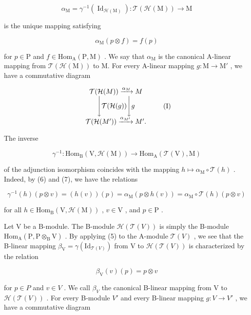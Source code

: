 \[
\alpha_ {\mathrm{M}} = \gamma^ {- 1} (\operatorname{Id} _ {\mathcal {H} (\mathrm{M})}): \mathcal {T} (\mathcal {H} (\mathrm{M})) \longrightarrow \mathrm{M}
\]

is the unique mapping satisfying

\[
\alpha_ {\mathrm{M}} (p \otimes f) = f (p)\tag{7}
\]

for \(p \in \mathrm{P}\) and \(f \in \mathrm{Hom}_{\mathrm{A}}(\mathrm{P}, \mathrm{M})\) . We say that \(\alpha_{\mathrm{M}}\) is the canonical A-linear mapping from \(\mathcal{T}(\mathcal{H}(\mathrm{M}))\) to M. For every A-linear mapping \(g: \mathrm{M} \to \mathrm{M}'\) , we have a commutative diagram

\[
\begin{array}{c} \mathcal {T} (\mathcal {H} (M)) \xrightarrow {\alpha_ {M}} M \\ \Biggl \downarrow \mathcal {T} (\mathcal {H} (g)) \Biggl \downarrow g \\ \mathcal {T} (\mathcal {H} (M ^ {\prime})) \xrightarrow {\alpha_ {M ^ {\prime}}} M ^ {\prime}. \end{array}\tag{I}
\]

The inverse

\[
\gamma^ {- 1}: \mathrm{Hom} _ {\mathrm{B}} (\mathrm{V}, \mathcal {H} (\mathrm{M})) \longrightarrow \mathrm{Hom} _ {\mathrm{A}} (\mathcal {T} (\mathrm{V}), \mathrm{M})
\]

of the adjunction isomorphism coincides with the mapping \(h \mapsto \alpha_{\mathrm{M}} \circ \mathcal{T}(h)\) . Indeed, by (6) and (7), we have the relations

\[
\gamma^ {- 1} (h) (p \otimes v) = (h (v)) (p) = \alpha_ {\mathrm{M}} (p \otimes h (v)) = \alpha_ {\mathrm{M}} \circ \mathcal {T} (h) (p \otimes v)
\]

for all \(h\in \mathrm{Hom}_{\mathrm{B}}(\mathrm{V},\mathcal{H}(\mathrm{M}))\) , \(v\in \mathrm{V}\) , and \(p\in \mathrm{P}\) .

Let V be a B-module. The B-module \(\mathcal{H}(\mathcal{T}(V))\) is simply the B-module \(\mathrm{Hom}_{\mathrm{A}}(\mathrm{P},\mathrm{P}\otimes_{\mathrm{B}}\mathrm{V})\) . By applying (5) to the A-module \(\mathcal{T}(V)\) , we see that the B-linear mapping \(\beta_{\mathrm{V}}=\gamma(\mathrm{Id}_{\mathcal{T}(V)})\) from V to \(\mathcal{H}(\mathcal{T}(V))\) is characterized by the relation

\[
\beta_ {\mathrm{V}} (v) (p) = p \otimes v\tag{8}
\]

for \(p \in P\) and \(v \in V\) . We call \(\beta_{V}\) the canonical B-linear mapping from V to \(\mathcal{H}(\mathcal{T}(V))\) . For every B-module \(V'\) and every B-linear mapping \(g : V \to V'\) , we have a commutative diagram

